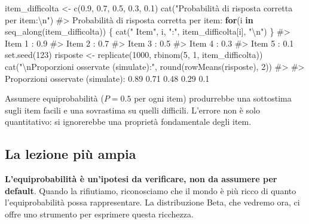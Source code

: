 \documentclass[
  italian,
  letterpaper,
  a4paper,
  11pt,
  open=any]{scrbook}
\newenvironment{Shaded}{\begin{snugshade}}{\end{snugshade}}
\newcommand{\CommentTok}[1]{\textcolor[rgb]{0.37,0.37,0.37}{#1}}
\newcommand{\ControlFlowTok}[1]{\textcolor[rgb]{0.00,0.23,0.31}{\textbf{#1}}}
\newcommand{\DecValTok}[1]{\textcolor[rgb]{0.68,0.00,0.00}{#1}}
\newcommand{\FloatTok}[1]{\textcolor[rgb]{0.68,0.00,0.00}{#1}}
\newcommand{\FunctionTok}[1]{\textcolor[rgb]{0.28,0.35,0.67}{#1}}
\newcommand{\NormalTok}[1]{\textcolor[rgb]{0.00,0.23,0.31}{#1}}
\newcommand{\OtherTok}[1]{\textcolor[rgb]{0.00,0.23,0.31}{#1}}
\newcommand{\SpecialCharTok}[1]{\textcolor[rgb]{0.37,0.37,0.37}{#1}}
\newcommand{\StringTok}[1]{\textcolor[rgb]{0.13,0.47,0.30}{#1}}
\theoremstyle{plain}
\theoremstyle{definition}
\theoremstyle{definition}
\theoremstyle{remark}
\begin{document}
\begin{Shaded}
\begin{Highlighting}[]
\NormalTok{item\_difficolta }\OtherTok{\textless{}{-}} \FunctionTok{c}\NormalTok{(}\FloatTok{0.9}\NormalTok{, }\FloatTok{0.7}\NormalTok{, }\FloatTok{0.5}\NormalTok{, }\FloatTok{0.3}\NormalTok{, }\FloatTok{0.1}\NormalTok{)}
\FunctionTok{cat}\NormalTok{(}\StringTok{"Probabilità di risposta corretta per item:}\SpecialCharTok{\textbackslash{}n}\StringTok{"}\NormalTok{)}
\CommentTok{\#\textgreater{} Probabilità di risposta corretta per item:}
\ControlFlowTok{for}\NormalTok{(i }\ControlFlowTok{in} \FunctionTok{seq\_along}\NormalTok{(item\_difficolta)) \{}
  \FunctionTok{cat}\NormalTok{(}\StringTok{"  Item"}\NormalTok{, i, }\StringTok{":"}\NormalTok{, item\_difficolta[i], }\StringTok{"}\SpecialCharTok{\textbackslash{}n}\StringTok{"}\NormalTok{)}
\NormalTok{\}}
\CommentTok{\#\textgreater{}   Item 1 : 0.9 }
\CommentTok{\#\textgreater{}   Item 2 : 0.7 }
\CommentTok{\#\textgreater{}   Item 3 : 0.5 }
\CommentTok{\#\textgreater{}   Item 4 : 0.3 }
\CommentTok{\#\textgreater{}   Item 5 : 0.1}
\FunctionTok{set.seed}\NormalTok{(}\DecValTok{123}\NormalTok{)}
\NormalTok{risposte }\OtherTok{\textless{}{-}} \FunctionTok{replicate}\NormalTok{(}\DecValTok{1000}\NormalTok{, }\FunctionTok{rbinom}\NormalTok{(}\DecValTok{5}\NormalTok{, }\DecValTok{1}\NormalTok{, item\_difficolta))}
\FunctionTok{cat}\NormalTok{(}\StringTok{"}\SpecialCharTok{\textbackslash{}n}\StringTok{Proporzioni osservate (simulate):"}\NormalTok{, }\FunctionTok{round}\NormalTok{(}\FunctionTok{rowMeans}\NormalTok{(risposte), }\DecValTok{2}\NormalTok{))}
\CommentTok{\#\textgreater{} }
\CommentTok{\#\textgreater{} Proporzioni osservate (simulate): 0.89 0.71 0.48 0.29 0.1}
\end{Highlighting}
\end{Shaded}

Assumere equiprobabilità (\(P = 0.5\) per ogni item) produrrebbe una
sottostima sugli item facili e una sovrastima su quelli difficili.
L'errore non è solo quantitativo: si ignorerebbe una proprietà
fondamentale degli item.

\subsection{La lezione più ampia}\label{la-lezione-piuxf9-ampia}

\textbf{L'equiprobabilità è un'ipotesi da verificare, non da assumere
per default}. Quando la rifiutiamo, riconosciamo che il mondo è più
ricco di quanto l'equiprobabilità possa rappresentare. La distribuzione
Beta, che vedremo ora, ci offre uno strumento per esprimere questa
ricchezza.
\end{document}
